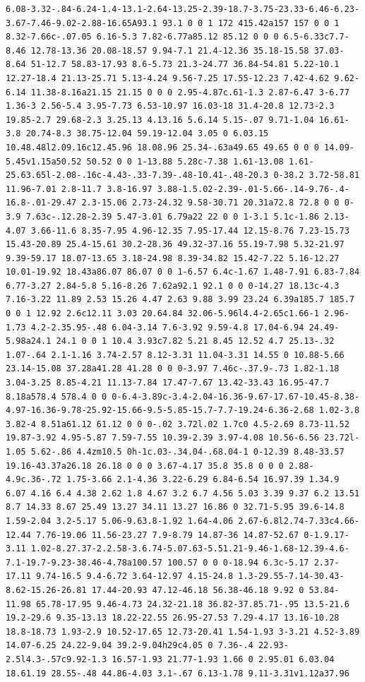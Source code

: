 \documentclass[11pt]{article}
\begin{document}
\begin{enumerate}
\begin{verbatim}
6.08-3.32-.84-6.24-1.4-13.1-2.64-13.25-2.39-18.7-3.75-23.33-6.46-6.23-3.67-7.46-9.02-2.88-16.65A93.1 93.1 0 0 1 172 415.42a157 157 0 0 1 8.32-7.66c-.07.05 6.16-5.3 7.82-6.77a85.12 85.12 0 0 0 6.5-6.33c7.7-8.46 12.78-13.36 20.08-18.57 9.94-7.1 21.4-12.36 35.18-15.58 37.03-8.64 51-12.7 58.83-17.93 8.6-5.73 21.3-24.77 36.84-54.81 5.22-10.1 12.27-18.4 21.13-25.71 5.13-4.24 9.56-7.25 17.55-12.23 7.42-4.62 9.62-6.14 11.38-8.16a21.15 21.15 0 0 0 2.95-4.87c.61-1.3 2.87-6.47 3-6.77 1.36-3 2.56-5.4 3.95-7.73 6.53-10.97 16.03-18 31.4-20.8 12.73-2.3 19.85-2.7 29.68-2.3 3.25.13 4.13.16 5.6.14 5.15-.07 9.71-1.04 16.61-3.8 20.74-8.3 38.75-12.04 59.19-12.04 3.05 0 6.03.15 10.48.48l2.09.16c12.45.96 18.08.96 25.34-.63a49.65 49.65 0 0 0 14.09-5.45v1.15a50.52 50.52 0 0 1-13.88 5.28c-7.38 1.61-13.08 1.61-25.63.65l-2.08-.16c-4.43-.33-7.39-.48-10.41-.48-20.3 0-38.2 3.72-58.81 11.96-7.01 2.8-11.7 3.8-16.97 3.88-1.5.02-2.39-.01-5.66-.14-9.76-.4-16.8-.01-29.47 2.3-15.06 2.73-24.32 9.58-30.71 20.31a72.8 72.8 0 0 0-3.9 7.63c-.12.28-2.39 5.47-3.01 6.79a22 22 0 0 1-3.1 5.1c-1.86 2.13-4.07 3.66-11.6 8.35-7.95 4.96-12.35 7.95-17.44 12.15-8.76 7.23-15.73 15.43-20.89 25.4-15.61 30.2-28.36 49.32-37.16 55.19-7.98 5.32-21.97 9.39-59.17 18.07-13.65 3.18-24.98 8.39-34.82 15.42-7.22 5.16-12.27 10.01-19.92 18.43a86.07 86.07 0 0 1-6.57 6.4c-1.67 1.48-7.91 6.83-7.84 6.77-3.27 2.84-5.8 5.16-8.26 7.62a92.1 92.1 0 0 0-14.27 18.13c-4.3 7.16-3.22 11.89 2.53 15.26 4.47 2.63 9.88 3.99 23.24 6.39a185.7 185.7 0 0 1 12.92 2.6c12.11 3.03 20.64.84 32.06-5.96l4.4-2.65c1.66-1 2.96-1.73 4.2-2.35.95-.48 6.04-3.14 7.6-3.92 9.59-4.8 17.04-6.94 24.49-5.98a24.1 24.1 0 0 1 10.4 3.93c7.82 5.21 8.45 12.52 4.7 25.13-.32 1.07-.64 2.1-1.16 3.74-2.57 8.12-3.31 11.04-3.31 14.55 0 10.88-5.66 23.14-15.08 37.28a41.28 41.28 0 0 0-3.97 7.46c-.37.9-.73 1.82-1.18 3.04-3.25 8.85-4.21 11.13-7.84 17.47-7.67 13.42-33.43 16.95-47.7 8.18a578.4 578.4 0 0 0-6.4-3.89c-3.4-2.04-16.36-9.67-17.67-10.45-8.38-4.97-16.36-9.78-25.92-15.66-9.5-5.85-15.7-7.7-19.24-6.36-2.68 1.02-3.8 3.82-4 8.51a61.12 61.12 0 0 0-.02 3.72l.02 1.7c0 4.5-2.69 8.73-11.52 19.87-3.92 4.95-5.87 7.59-7.55 10.39-2.39 3.97-4.08 10.56-6.56 23.72l-1.05 5.62-.86 4.4zm10.5 0h-1c.03-.34.04-.68.04-1 0-12.39 8.48-33.57 19.16-43.37a26.18 26.18 0 0 0 3.67-4.17 35.8 35.8 0 0 0 2.88-4.9c.36-.72 1.75-3.66 2.1-4.36 3.22-6.29 6.84-6.54 16.97.39 1.34.9 6.07 4.16 6.4 4.38 2.62 1.8 4.67 3.2 6.7 4.56 5.03 3.39 9.37 6.2 13.51 8.7 14.33 8.67 25.49 13.27 34.11 13.27 16.86 0 32.71-5.95 39.6-14.8 1.59-2.04 3.2-5.17 5.06-9.63.8-1.92 1.64-4.06 2.67-6.8l2.74-7.33c4.66-12.44 7.76-19.06 11.56-23.27 7.9-8.79 14.87-36 14.87-52.67 0-1.9.17-3.11 1.02-8.27.37-2.2.58-3.6.74-5.07.63-5.51.21-9.46-1.68-12.39-4.6-7.1-19.7-9.23-38.46-4.78a100.57 100.57 0 0 0-18.94 6.3c-5.17 2.37-17.11 9.74-16.5 9.4-6.72 3.64-12.97 4.15-24.8 1.3-29.55-7.14-30.43-8.62-15.26-26.81 17.44-20.93 47.12-46.18 56.38-46.18 9.92 0 53.84-11.98 65.78-17.95 9.46-4.73 24.32-21.18 36.82-37.85.71-.95 13.5-21.6 19.2-29.6 9.35-13.13 18.22-22.55 26.95-27.53 7.29-4.17 13.16-10.28 18.8-18.73 1.93-2.9 10.52-17.65 12.73-20.41 1.54-1.93 3-3.21 4.52-3.89 14.07-6.25 24.22-9.04 39.2-9.04h29c4.05 0 7.36-.4 22.93-2.5l4.3-.57c9.92-1.3 16.57-1.93 21.77-1.93 1.66 0 2.95.01 6.03.04 18.61.19 28.55-.48 44.86-4.03 3.1-.67 6.13-1.78 9.11-3.31v1.12a37.96 
\end{verbatim}
\end{enumerate}
\end{document}
